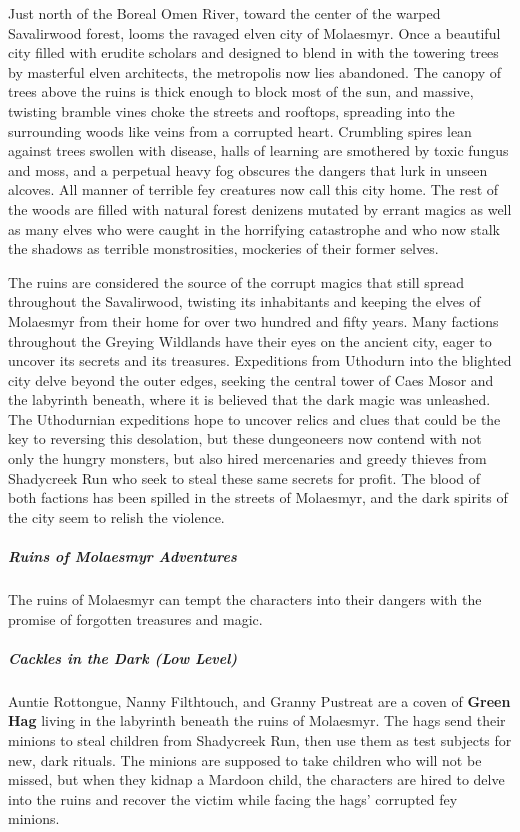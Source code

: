 \documentclass[10pt,a4paper,twoside,bg=print,twocolumn,openany,nodeprecatedcode]{dndbook}
\begin{document}
Just north of the Boreal Omen River, toward the center of the warped Savalirwood forest, looms the ravaged elven city of Molaesmyr. Once a beautiful city filled with erudite scholars and designed to blend in with the towering trees by masterful elven architects, the metropolis now lies abandoned. The canopy of trees above the ruins is thick enough to block most of the sun, and massive, twisting bramble vines choke the streets and rooftops, spreading into the surrounding woods like veins from a corrupted heart. Crumbling spires lean against trees swollen with disease, halls of learning are smothered by toxic fungus and moss, and a perpetual heavy fog obscures the dangers that lurk in unseen alcoves. All manner of terrible fey creatures now call this city home. The rest of the woods are filled with natural forest denizens mutated by errant magics as well as many elves who were caught in the horrifying catastrophe and who now stalk the shadows as terrible monstrosities, mockeries of their former selves.

The ruins are considered the source of the corrupt magics that still spread throughout the Savalirwood, twisting its inhabitants and keeping the elves of Molaesmyr from their home for over two hundred and fifty years. Many factions throughout the Greying Wildlands have their eyes on the ancient city, eager to uncover its secrets and its treasures. Expeditions from Uthodurn into the blighted city delve beyond the outer edges, seeking the central tower of Caes Mosor and the labyrinth beneath, where it is believed that the dark magic was unleashed. The Uthodurnian expeditions hope to uncover relics and clues that could be the key to reversing this desolation, but these dungeoneers now contend with not only the hungry monsters, but also hired mercenaries and greedy thieves from Shadycreek Run who seek to steal these same secrets for profit. The blood of both factions has been spilled in the streets of Molaesmyr, and the dark spirits of the city seem to relish the violence.

\subparagraph{Ruins of Molaesmyr Adventures}
The ruins of Molaesmyr can tempt the characters into their dangers with the promise of forgotten treasures and magic.

\subparagraph{Cackles in the Dark (Low Level)}
Auntie Rottongue, Nanny Filthtouch, and Granny Pustreat are a coven of \textbf{Green Hag} living in the labyrinth beneath the ruins of Molaesmyr. The hags send their minions to steal children from Shadycreek Run, then use them as test subjects for new, dark rituals. The minions are supposed to take children who will not be missed, but when they kidnap a Mardoon child, the characters are hired to delve into the ruins and recover the victim while facing the hags' corrupted fey minions.
\end{document}
